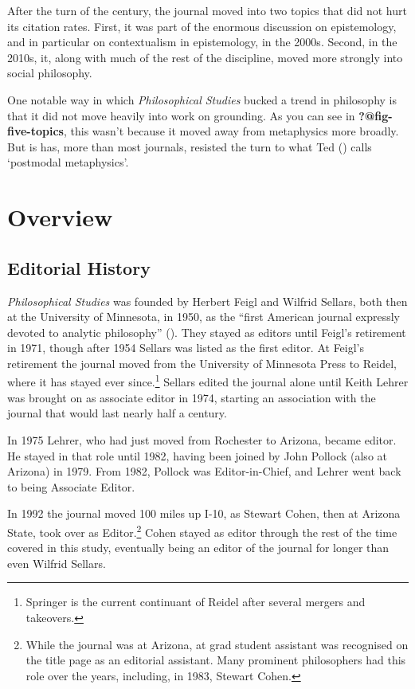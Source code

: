 \documentclass[
  10pt,
  letterpaper,
  DIV=11,
  numbers=noendperiod,
  twoside]{scrartcl}
\begin{document}
After the turn of the century, the journal moved into two topics that
did not hurt its citation rates. First, it was part of the enormous
discussion on epistemology, and in particular on contextualism in
epistemology, in the 2000s. Second, in the 2010s, it, along with much of
the rest of the discipline, moved more strongly into social philosophy.

One notable way in which \emph{Philosophical Studies} bucked a trend in
philosophy is that it did not move heavily into work on grounding. As
you can see in \textbf{?@fig-five-topics}, this wasn't because it moved
away from metaphysics more broadly. But is has, more than most journals,
resisted the turn to what Ted
() calls `postmodal
metaphysics'.

\section{Overview}\label{sec-overview}

\subsection{Editorial History}\label{editorial-history}

\emph{Philosophical Studies} was founded by Herbert Feigl and Wilfrid
Sellars, both then at the University of Minnesota, in 1950, as the
``first American journal expressly devoted to analytic philosophy''
(). They stayed as editors
until Feigl's retirement in 1971, though after 1954 Sellars was listed
as the first editor. At Feigl's retirement the journal moved from the
University of Minnesota Press to Reidel, where it has stayed ever
since.\footnote{Springer is the current continuant of Reidel after
  several mergers and takeovers.} Sellars edited the journal alone until
Keith Lehrer was brought on as associate editor in 1974, starting an
association with the journal that would last nearly half a century.

In 1975 Lehrer, who had just moved from Rochester to Arizona, became
editor. He stayed in that role until 1982, having been joined by John
Pollock (also at Arizona) in 1979. From 1982, Pollock was
Editor-in-Chief, and Lehrer went back to being Associate Editor.

In 1992 the journal moved 100 miles up I-10, as Stewart Cohen, then at
Arizona State, took over as Editor.\footnote{While the journal was at
  Arizona, at grad student assistant was recognised on the title page as
  an editorial assistant. Many prominent philosophers had this role over
  the years, including, in 1983, Stewart Cohen.} Cohen stayed as editor
through the rest of the time covered in this study, eventually being an
editor of the journal for longer than even Wilfrid Sellars.
\end{document}
